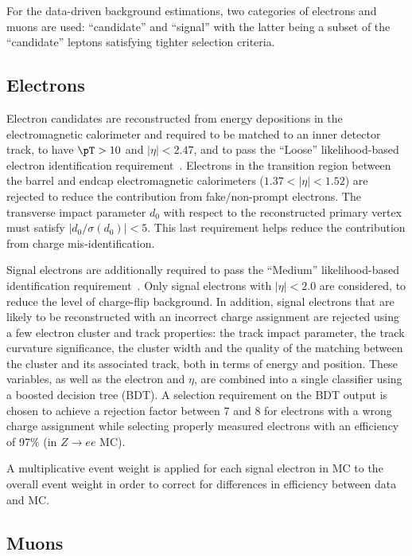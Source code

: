 For the data-driven background estimations, two categories of electrons and muons are used: 
``candidate'' and ``signal'' with the latter being a subset of the ``candidate'' leptons satisfying tighter selection criteria. 

\subsection*{Electrons}
\label{subsec:sec.strategy.sel.objects_electrons}

Electron candidates are reconstructed from energy depositions in the 
electromagnetic calorimeter and required to be matched to an 
inner detector track, 
to have $\pT> 10$ \GeV and $|\eta|<2.47$, and to pass the 
``Loose'' likelihood-based electron identification 
requirement~\cite{ATLAS-CONF-2016-024}.
Electrons in the transition region between the barrel and endcap 
electromagnetic calorimeters ($1.37<|\eta|<1.52$) are rejected to reduce 
the contribution from fake/non-prompt electrons. 
The transverse impact parameter $d_0$ 
with respect to the reconstructed primary vertex 
must satisfy $|d_0/\sigma(d_0)|<5$.
This last requirement helps reduce the contribution from charge 
mis-identification. 

Signal electrons are additionally required to pass the ``Medium'' 
likelihood-based identification requirement~\cite{ATLAS-CONF-2016-024}.
Only signal electrons with $|\eta|<2.0$ are considered, 
to reduce the level of charge-flip background.
In addition, signal electrons that are likely to be reconstructed with an incorrect charge assignment are rejected using a few electron cluster and track properties: the track impact parameter, the track curvature significance, the cluster width and the quality of the matching between the cluster and its associated track, both in terms of energy and position. These variables, as well as the electron \pt and $\eta$, are combined into a single classifier using a boosted decision tree (BDT). A selection requirement on the BDT output is chosen to achieve a rejection factor between 7 and 8 for electrons with a wrong charge assignment while selecting properly measured electrons with an efficiency of 97\% (in $Z\rightarrow ee$ MC). 

A multiplicative event weight is applied for each signal electron in MC to the overall event weight 
in order to correct for differences in efficiency between data and MC.

\subsection*{Muons}
\label{subsec:sec.strategy.sel.objects_muons}

